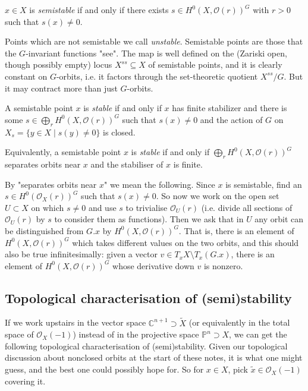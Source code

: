 \documentclass[12pt]{article}
\begin{document}
\begin{definition}
    $x \in X$ is \emph{semistable} if and only if there exists $s \in H^0(X, \mathcal{O}(r))^G$ with $r > 0$ such that $s(x) \neq 0$.
\end{definition}

Points which are not semistable we call \emph{unstable}. Semistable points are those that the $G$-invariant functions "see". The map is well defined on the (Zariski open, though possibly empty) locus $X^{ss} \subseteq X$ of semistable points, and it is clearly constant on $G$-orbits, i.e. it factors through the set-theoretic quotient $X^{ss}/G$. But it may contract more than just $G$-orbits.

\begin{definition}
    A semistable point $x$ is \emph{stable} if and only if $x$ has finite stabilizer and there is some $s\in \bigoplus_r H^0(X, \mathcal{O}(r))^G$ such that $s(x) \neq 0$ and the action of $G$ on $X_s = \{y \in X \mid s(y) \neq 0\}$ is closed.

    Equivalently, a semistable point $x$ is \emph{stable} if and only if $\bigoplus_r H^0(X, \mathcal{O}(r))^G$ separates orbits near $x$ and the stabiliser of $x$ is finite.
\end{definition}


By "separates orbits near $x$" we mean the following. Since $x$ is semistable, find an $s \in H^0(\mathcal{O}_X(r))^G$ such that $s(x) \neq 0$. So now we work on the open set $U \subset X$ on which $s \neq 0$ and use $s$ to trivialise $\mathcal{O}_U(r)$ (i.e. divide all sections of $\mathcal{O}_U(r)$ by $s$ to consider them as functions). Then we ask that in $U$ any orbit can be distinguished from $G.x$ by $H^0(X, \mathcal{O}(r))^G$. That is, there is an element of $H^0(X, \mathcal{O}(r))^G$ which takes different values on the two orbits, and this should also be true infinitesimally: given a vector $v \in T_x X \setminus T_x(G.x)$, there is an element of $H^0(X, \mathcal{O}(r))^G$ whose derivative down $v$ is nonzero.

\subsection{Topological characterisation of (semi)stability}
If we work upstairs in the vector space $\mathbb{C}^{n+1} \supset \tilde{X}$ (or equivalently in the total space of $\mathcal{O}_X(-1)$) instead of in the projective space $\mathbb{P}^n \supset X$, we can get the following topological characterisation of (semi)stability. Given our topological discussion about nonclosed orbits at the start of these notes, it is what one might guess, and the best one could possibly hope for. So for $x \in X$, pick $\tilde{x} \in \mathcal{O}_X(-1)$ covering it.
\end{document}
